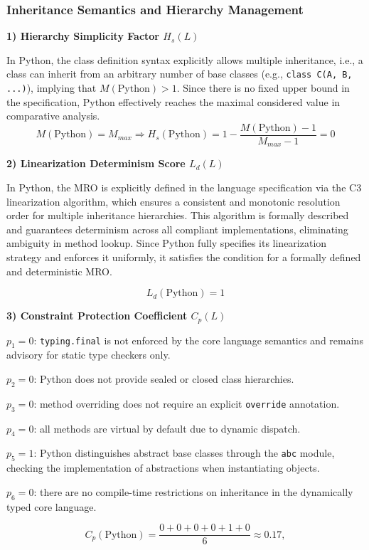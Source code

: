 \subsubsection{Inheritance Semantics and Hierarchy Management}

\textbf{1) Hierarchy Simplicity Factor $H_s(L)$}

In Python, the class definition syntax explicitly allows multiple inheritance, i.e., a class can inherit from an arbitrary number of base classes (e.g., \texttt{class C(A, B, ...)}), implying that $M(\text{Python}) > 1$. Since there is no fixed upper bound in the specification, Python effectively reaches the maximal considered value in comparative analysis.
\[
    M(\text{Python}) = M_{max}
    \Rightarrow H_s(\text{Python}) = 1 - \frac{M(\text{Python}) - 1}{M_{max} - 1} = 0
\]


\textbf{2) Linearization Determinism Score $L_d(L)$}

In Python, the MRO is explicitly defined in the language specification via the C3 linearization algorithm, which ensures a consistent and monotonic resolution order for multiple inheritance hierarchies. This algorithm is formally described and guarantees determinism across all compliant implementations, eliminating ambiguity in method lookup. Since Python fully specifies its linearization strategy and enforces it uniformly, it satisfies the condition for a formally defined and deterministic MRO.

\[
    L_d(\text{Python})=1
\]


\textbf{3) Constraint Protection Coefficient $C_p(L)$}

$p_1=0$: \texttt{typing.final} is not enforced by the core language semantics and remains advisory for static type checkers only.

$p_2=0$: Python does not provide sealed or closed class hierarchies.

$p_3=0$: method overriding does not require an explicit \texttt{override} annotation.

$p_4=0$: all methods are virtual by default due to dynamic dispatch.

$p_5=1$: Python distinguishes abstract base classes through the \texttt{abc} module, checking the implementation of abstractions when instantiating objects.

$p_6=0$: there are no compile-time restrictions on inheritance in the dynamically typed core language.

\[
    C_p(\text{Python}) = \frac{0+0+0+0+1+0}{6} \approx 0.17,
\]


